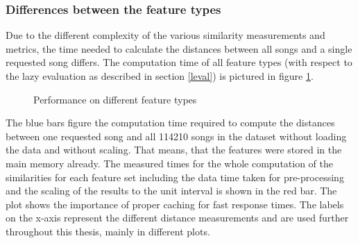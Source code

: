 \subsubsection{Differences between the feature types}

Due to the different complexity of the various similarity measurements and metrics, the time needed to calculate the distances between all songs and a single requested song differs. The computation time of all feature types (with respect to the lazy evaluation as described in section \ref{leval}) is pictured in figure \ref{features}. 

\begin{figure}[htbp]
	\centering
	\caption{Performance on different feature types}
	\label{features}
\end{figure}
\FloatBarrier

\noindent The blue bars figure the computation time required to compute the distances between one requested song and all 114210 songs in the dataset without loading the data and without scaling. That means, that the features were stored in the main memory already. The measured times for the whole computation of the similarities for each feature set including the data time taken for pre-processing and the scaling of the results to the unit interval is shown in the red bar. The plot shows the importance of proper caching for fast response times. 
\noindent The labels on the x-axis represent the different distance measurements and are used further throughout this thesis, mainly in different plots. 

